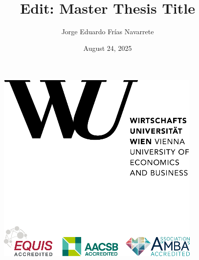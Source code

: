 \documentclass[
  12pt,
  a4paper,
  openany]{scrbook}
\title{Edit: Master Thesis Title}
\author{Jorge Eduardo Frías Navarrete}
\date{August 24, 2025}
\begin{document}
\frontmatter


\thispagestyle{empty}
\begin{figure}[h!]
    \raggedleft
    \includegraphics[scale=0.9]{pictures/WULogo.png}
\end{figure}

\vspace{1em}
\end{document}
